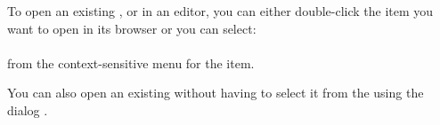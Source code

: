 To open an existing \gdcase{}, \gdsuite{} or \gdjob{} in an editor, you can either double-click the item you want to open in its browser or you can select:\\
\\
from the context-sensitive menu for the item. 

You can also open an existing \gdcase{} without having to select it from the \gdtestcasebrowser{} using the  dialog . 




